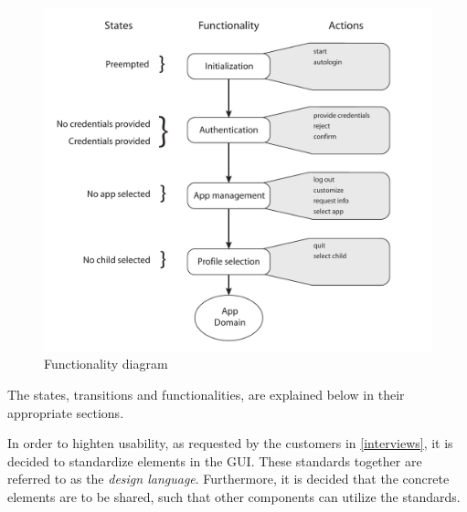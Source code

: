 \begin{figure}[h!]
	\centering
	\includegraphics[width=1\textwidth]{gfx/design_diagram.pdf}
	\caption{Functionality diagram}
	\label{fig:design_diagram}
\end{figure}

The states, transitions and functionalities, are explained below in their appropriate sections.

In order to highten usability, as requested by the customers in \autoref{interviews}, it is decided to standardize elements in the GUI. These standards together are referred to as the \emph{design language}.
Furthermore, it is decided that the concrete elements are to be shared, such that other \giraf[] components can utilize the standards.